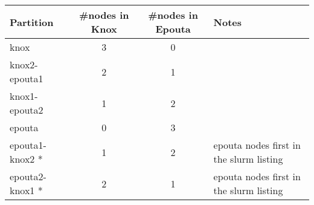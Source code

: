 \begin{longtable}[]{@{}lccl@{}}
\toprule
Partition & \#nodes in Knox & \#nodes in Epouta & Notes\tabularnewline
\midrule
\endhead
\begin{minipage}[t]{0.24\columnwidth}\raggedright\strut
knox\strut
\end{minipage} & \begin{minipage}[t]{0.24\columnwidth}\centering\strut
3\strut
\end{minipage} & \begin{minipage}[t]{0.24\columnwidth}\centering\strut
0\strut
\end{minipage} & \begin{minipage}[t]{0.24\columnwidth}\raggedright\strut
\strut
\end{minipage}\tabularnewline
\begin{minipage}[t]{0.24\columnwidth}\raggedright\strut
knox2-epouta1\strut
\end{minipage} & \begin{minipage}[t]{0.24\columnwidth}\centering\strut
2\strut
\end{minipage} & \begin{minipage}[t]{0.24\columnwidth}\centering\strut
1\strut
\end{minipage} & \begin{minipage}[t]{0.24\columnwidth}\raggedright\strut
\strut
\end{minipage}\tabularnewline
\begin{minipage}[t]{0.24\columnwidth}\raggedright\strut
knox1-epouta2\strut
\end{minipage} & \begin{minipage}[t]{0.24\columnwidth}\centering\strut
1\strut
\end{minipage} & \begin{minipage}[t]{0.24\columnwidth}\centering\strut
2\strut
\end{minipage} & \begin{minipage}[t]{0.24\columnwidth}\raggedright\strut
\strut
\end{minipage}\tabularnewline
\begin{minipage}[t]{0.24\columnwidth}\raggedright\strut
epouta\strut
\end{minipage} & \begin{minipage}[t]{0.24\columnwidth}\centering\strut
0\strut
\end{minipage} & \begin{minipage}[t]{0.24\columnwidth}\centering\strut
3\strut
\end{minipage} & \begin{minipage}[t]{0.24\columnwidth}\raggedright\strut
\strut
\end{minipage}\tabularnewline
epouta1-knox2 * & 1 & 2 & epouta nodes first in the slurm
listing\tabularnewline
epouta2-knox1 * & 2 & 1 & epouta nodes first in the slurm
listing\tabularnewline
\bottomrule
\end{longtable}

